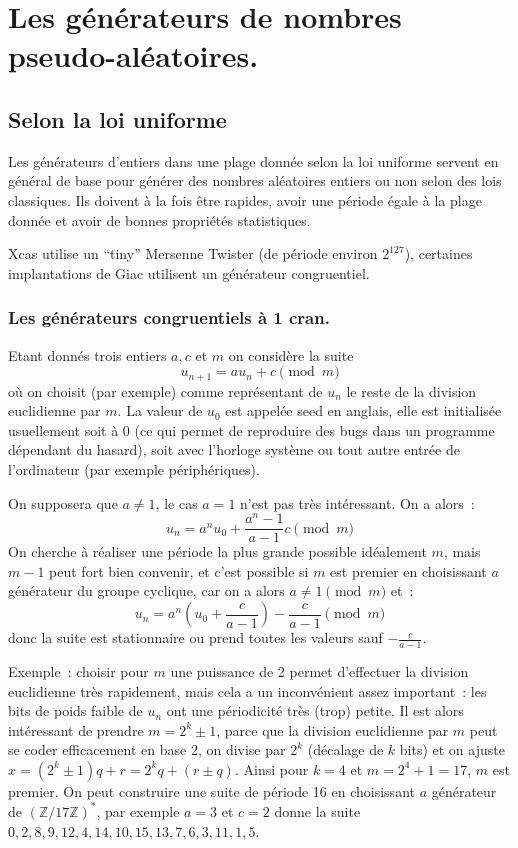 \documentclass[a4paper,11pt]{article}
\begin{document}
\begin{giacjshere}
\begin{enumerate}
\end{enumerate}
\pagebreak

\section{Les générateurs de nombres pseudo-aléatoires.}
\label{sec:random}
\subsection{Selon la loi uniforme}
Les générateurs d'entiers dans une plage donnée selon la loi
uniforme servent en général de base pour générer des 
nombres aléatoires entiers ou non selon des lois classiques.
Ils doivent à la fois être rapides, avoir une période égale à
la plage donnée et avoir de bonnes propriétés statistiques.

Xcas utilise un ``tiny'' Mersenne Twister (de période environ $2^{127}$),
certaines implantations de Giac utilisent un générateur congruentiel.

\subsubsection{Les générateurs congruentiels \`a 1 cran.}
Etant donnés trois entiers $a, c$ et $m$ on considère la suite
$$ u_{n+1}=au_n+c \pmod m $$
où on choisit (par exemple) comme représentant de $u_n$
le reste de la division euclidienne par $m$. La valeur de $u_0$
est appelée seed en anglais, elle est initialisée usuellement
soit à 0 (ce qui permet de reproduire des bugs dans un programme
dépendant du hasard), soit avec l'horloge système ou tout autre
entrée de l'ordinateur (par exemple périphériques).

On supposera que $a\neq 1$, le cas $a=1$ n'est pas tr\`es
int\'eressant. On a alors~:
$$ u_n=a^n u_0 + \frac{a^n-1}{a-1} c \pmod m$$
On cherche \`a r\'ealiser une p\'eriode la plus grande possible
id\'ealement $m$, mais $m-1$ peut fort bien convenir, et c'est
possible si $m$ est premier en choisissant 
$a$ g\'en\'erateur du groupe cyclique, car on a alors $a\neq 1 \pmod m$ et~:
$$ u_n=a^n (u_0 + \frac{c}{a-1}) - \frac{c}{a-1}  \pmod m$$
donc la suite est stationnaire ou prend toutes les valeurs sauf $- \frac{c}{a-1} $.

Exemple~: choisir pour $m$ une puissance de 2 permet d'effectuer
la division euclidienne tr\`es rapidement, mais cela a un
inconv\'enient assez important~: les bits de poids faible
de $u_n$ ont une p\'eriodicit\'e tr\`es (trop) petite.
Il est alors int\'eressant de prendre $m=2^k \pm 1$, parce
que la division euclidienne par $m$ peut se coder efficacement en base
2, on divise par $2^k$ (d\'ecalage de $k$ bits) et on ajuste
$x=(2^k \pm 1)q+r=2^k q + (r \pm q)$.
Ainsi pour $k=4$ et $m=2^4+1=17$, $m$ est premier.
On peut construire une suite de p\'eriode 16 en choisissant $a$ g\'en\'erateur
de $(\mathbb{Z}/17\mathbb{Z})^*$, par exemple $a=3$ et $c=2$ donne la suite
$0,2,8,9,12,4,14,10,15,13,7,6,3,11,1,5$.


\end{giacjshere}
\end{document}
